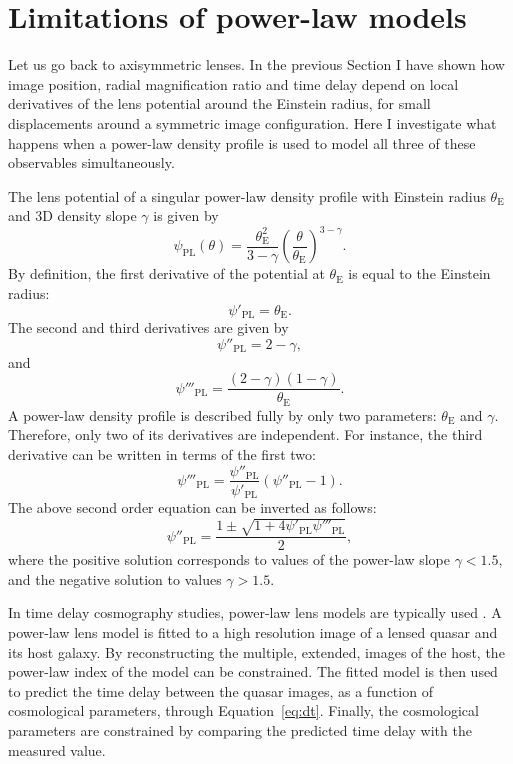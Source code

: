 \documentclass[usenatbib]{mnras}
\def\psiiii{\psi'''}
\def\tein{\theta_{\mathrm{E}}}
\def\Eref#1{Equation~\ref{#1}\xspace}
\begin{document}
\section{Limitations of power-law models}\label{sect:pl}

Let us go back to axisymmetric lenses.
In the previous Section I have shown how image position, radial magnification ratio and time delay depend on local derivatives of the lens potential around the Einstein radius, for small displacements around a symmetric image configuration.
Here I investigate what happens when a power-law density profile is used to model all three of these observables simultaneously.

The lens potential of a singular power-law density profile with Einstein radius $\tein$ and 3D density slope $\gamma$ is given by
\begin{equation}
\psi_{\mathrm{PL}}(\theta) = \frac{\tein^2}{3-\gamma}\left(\frac{\theta}{\tein}\right)^{3-\gamma}.
\end{equation}
By definition, the first derivative of the potential at $\tein$ is equal to the Einstein radius: 
\begin{equation}
\psi'_{\mathrm{PL}} = \tein.
\end{equation}
The second and third derivatives are given by
\begin{equation}\label{eq:psiiipl}
\psi''_{\mathrm{PL}} = 2 - \gamma,
\end{equation}
and
\begin{equation}
\psi'''_{\mathrm{PL}} = \frac{(2-\gamma)(1-\gamma)}{\tein}.
\end{equation}
A power-law density profile is described fully by only two parameters: $\tein$ and $\gamma$. Therefore, only two of its derivatives are independent. For instance, the third derivative can be written in terms of the first two:
\begin{equation}
\psi'''_{\mathrm{PL}} = \frac{\psi''_{\mathrm{PL}}}{\psi'_{\mathrm{PL}}}(\psi''_{\mathrm{PL}} - 1).
\end{equation}
The above second order equation can be inverted as follows:
\begin{equation}\label{eq:psiiipl_given_psiiii}
\psi''_{\mathrm{PL}} = \frac{1 \pm \sqrt{1 + 4\psi'_{\mathrm{PL}}\psiiii_{\mathrm{PL}}}}{2},
\end{equation}
where the positive solution corresponds to values of the power-law slope $\gamma < 1.5$, and the negative solution to values $\gamma > 1.5$.

In time delay cosmography studies, power-law lens models are typically used \citep{Suy++10, Suy++13, Won++17}.
A power-law lens model is fitted to a high resolution image of a lensed quasar and its host galaxy. By reconstructing the multiple, extended, images of the host, the power-law index of the model can be constrained.
The fitted model is then used to predict the time delay between the quasar images, as a function of cosmological parameters, through \Eref{eq:dt}. Finally, the cosmological parameters are constrained by comparing the predicted time delay with the measured value.
\end{document}
